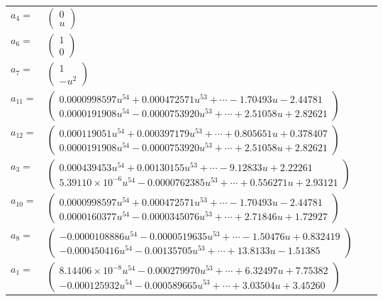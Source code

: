 \documentclass[1p]{elsarticle_modified}
\theoremstyle{definition}
\begin{document}
\begin{tabular}{m{7pt} m{180pt} m{7pt} m{180pt} }
\flushright $a_{4}=$&$\begin{pmatrix}0\\u\end{pmatrix}$ \\
\flushright $a_{6}=$&$\begin{pmatrix}1\\0\end{pmatrix}$ \\
\flushright $a_{7}=$&$\begin{pmatrix}1\\- u^2\end{pmatrix}$ \\
\flushright $a_{11}=$&$\begin{pmatrix}0.0000998597 u^{54}+0.000472571 u^{53}+\cdots-1.70493 u-2.44781\\0.0000191908 u^{54}-0.0000753920 u^{53}+\cdots+2.51058 u+2.82621\end{pmatrix}$ \\
\flushright $a_{12}=$&$\begin{pmatrix}0.000119051 u^{54}+0.000397179 u^{53}+\cdots+0.805651 u+0.378407\\0.0000191908 u^{54}-0.0000753920 u^{53}+\cdots+2.51058 u+2.82621\end{pmatrix}$ \\
\flushright $a_{3}=$&$\begin{pmatrix}0.000439453 u^{54}+0.00130155 u^{53}+\cdots-9.12833 u+2.22261\\5.39110\times10^{-6} u^{54}-0.0000762385 u^{53}+\cdots+0.556271 u+2.93121\end{pmatrix}$ \\
\flushright $a_{10}=$&$\begin{pmatrix}0.0000998597 u^{54}+0.000472571 u^{53}+\cdots-1.70493 u-2.44781\\0.0000160377 u^{54}-0.0000345076 u^{53}+\cdots+2.71846 u+1.72927\end{pmatrix}$ \\
\flushright $a_{8}=$&$\begin{pmatrix}-0.0000108886 u^{54}-0.0000519635 u^{53}+\cdots-1.50476 u+0.832419\\-0.000450416 u^{54}-0.00135705 u^{53}+\cdots+13.8133 u-1.51385\end{pmatrix}$ \\
\flushright $a_{1}=$&$\begin{pmatrix}8.14406\times10^{-8} u^{54}-0.000279970 u^{53}+\cdots+6.32497 u+7.75382\\-0.000125932 u^{54}-0.000589665 u^{53}+\cdots+3.03504 u+3.45260\end{pmatrix}$ \\

\end{tabular}
\end{document}
